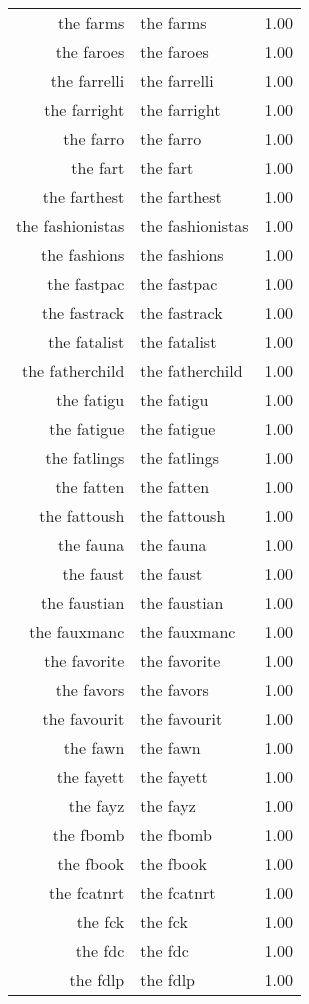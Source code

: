 \begin{table}[ht]
\begin{tabular}{rlr}
  the farms & the farms & 1.00 \\ 
  the faroes & the faroes & 1.00 \\ 
  the farrelli & the farrelli & 1.00 \\ 
  the farright & the farright & 1.00 \\ 
  the farro & the farro & 1.00 \\ 
  the fart & the fart & 1.00 \\ 
  the farthest & the farthest & 1.00 \\ 
  the fashionistas & the fashionistas & 1.00 \\ 
  the fashions & the fashions & 1.00 \\ 
  the fastpac & the fastpac & 1.00 \\ 
  the fastrack & the fastrack & 1.00 \\ 
  the fatalist & the fatalist & 1.00 \\ 
  the fatherchild & the fatherchild & 1.00 \\ 
  the fatigu & the fatigu & 1.00 \\ 
  the fatigue & the fatigue & 1.00 \\ 
  the fatlings & the fatlings & 1.00 \\ 
  the fatten & the fatten & 1.00 \\ 
  the fattoush & the fattoush & 1.00 \\ 
  the fauna & the fauna & 1.00 \\ 
  the faust & the faust & 1.00 \\ 
  the faustian & the faustian & 1.00 \\ 
  the fauxmanc & the fauxmanc & 1.00 \\ 
  the favorite & the favorite & 1.00 \\ 
  the favors & the favors & 1.00 \\ 
  the favourit & the favourit & 1.00 \\ 
  the fawn & the fawn & 1.00 \\ 
  the fayett & the fayett & 1.00 \\ 
  the fayz & the fayz & 1.00 \\ 
  the fbomb & the fbomb & 1.00 \\ 
  the fbook & the fbook & 1.00 \\ 
  the fcatnrt & the fcatnrt & 1.00 \\ 
  the fck & the fck & 1.00 \\ 
  the fdc & the fdc & 1.00 \\ 
  the fdlp & the fdlp & 1.00 \\ 

\end{tabular}
\end{table}
